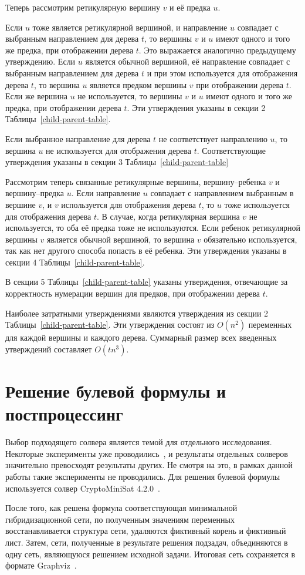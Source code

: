 Теперь рассмотрим ретикулярную вершину $v$ и её предка $u$.

Если $u$ тоже является ретикулярной вершиной, и направление $u$ совпадает с выбранным направлением для дерева $t$, то вершины $v$ и $u$ имеют одного и того же предка, при отображении дерева $t$.
Это выражается аналогично предыдущему утверждению.
Если $u$ является обычной вершиной, её направление совпадает с выбранным направлением для дерева $t$ и при этом используется для отображения дерева $t$, то вершина $u$ является предком вершины $v$ при отображении дерева $t$.
Если же вершина $u$ не используется, то вершины $v$ и $u$ имеют одного и того же предка, при отображении дерева $t$.
Эти утверждения указаны в секции 2 Таблицы~\ref{child-parent-table}.

Если выбранное направление для дерева $t$ не соответствует направлению $u$, то вершина $u$ не используется для отображения дерева $t$.
Соответствующие утверждения указаны в секции 3 Таблицы~\ref{child-parent-table}

Рассмотрим теперь связанные ретикулярные вершины, вершину--ребенка $v$ и вершину--предка $u$.
Если направление $u$ совпадает с направлением выбранным в вершине $v$, и $v$ используется для отображения дерева $t$, то $u$ тоже используется для отображения дерева $t$.
В случае, когда ретикулярная вершина $v$ не используется, то оба её предка тоже не используются.
Если ребенок ретикулярной вершины $v$ является обычной вершиной, то вершина $v$ обязательно используется, так как нет другого способа попасть в её ребенка.
Эти утверждения указаны в секции 4 Таблицы~\ref{child-parent-table}.

В секции 5 Таблицы~\ref{child-parent-table} указаны утверждения, отвечающие за корректность нумерации вершин для предков, при отображении дерева $t$.

Наиболее затратными утверждениями являются утверждения из секции 2 Таблицы~\ref{child-parent-table}.
Эти утверждения состоят из $O(n^2)$ переменных для каждой вершины и каждого дерева.
Суммарный размер всех введенных утверждений составляет $O(tn^3)$.

\FloatBarrier
\section{Решение булевой формулы и постпроцессинг}

Выбор подходящего солвера является темой для отдельного исследования. Некоторые эксперименты уже проводились~\cite{bonet2009efficiently}, и результаты отдельных солверов значительно превосходят результаты других. Не смотря на это, в рамках данной работы такие эксперименты не проводились. Для решения булевой формулы используется солвер CryptoMiniSat 4.2.0~\cite{cryptominisat}.

После того, как решена формула соответствующая минимальной гибридизационной сети, по полученным значениям переменных восстанавливается структура сети, удаляются фиктивный корень и фиктивный лист.
Затем, сети, полученные в результате решения подзадач, объединяются в одну сеть, являющуюся решением исходной задачи.
Итоговая сеть сохраняется в формате Graphviz~\cite{Gansner00anopen}.